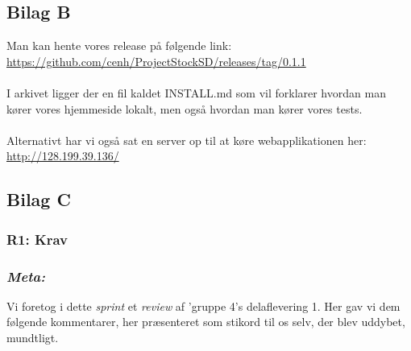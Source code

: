 \documentclass[12pt]{article}
\begin{document}
\subsection{Bilag B}
\label{sec:bilagB}
Man kan hente vores release på følgende link:
\url{https://github.com/cenh/ProjectStockSD/releases/tag/0.1.1}\\
\\
I arkivet ligger der en fil kaldet INSTALL.md som vil forklarer hvordan man kører vores hjemmeside lokalt, men også hvordan man kører vores tests. \\ \\
Alternativt har vi også sat en server op til at køre webapplikationen her: \url{http://128.199.39.136/}

\subsection{Bilag C}
\label{sec:bilagC}
\subsubsection{R1: Krav}

\subsubsection*{\textit{Meta:}}
Vi foretog i dette \textit{sprint} et \textit{review} af 'gruppe 4's delaflevering 1. Her gav vi dem følgende kommentarer, her præsenteret som stikord til os selv, der blev uddybet, mundtligt.
\end{document}
